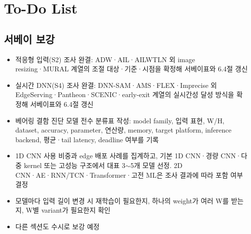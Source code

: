\documentclass[10pt]{article}
\begin{document}
\section{To-Do List}
\subsection{서베이 보강}
\begin{itemize}
\item[$\square$] 적응형 입력(S2) 조사 완결: ADW·AIL·AILWTLN 외 image resizing·MURAL 계열의 조절 대상·기준·시점을 확정해 서베이표와 6.4절 갱신
\item[$\square$] 실시간 DNN(S4) 조사 완결: DNN-SAM·AMS·FLEX·Imprecise 외 EdgeServing·Pantheon·SCENIC·early-exit 계열의 실시간성 달성 방식을 확정해 서베이표와 6.4절 갱신
\item[$\square$] 베어링 결함 진단 모델 전수 분류표 작성: model family, 입력 표현, W/H, dataset, accuracy, parameter, 연산량, memory, target platform, inference backend, 평균·tail latency, deadline 여부를 기록
\item[$\square$] 1D CNN 사용 비중과 edge 배포 사례를 집계하고, 기본 1D CNN·경량 CNN·다중 kernel 또는 고성능 구조에서 대표 3$\sim$5개 모델 선정. 2D CNN·AE·RNN/TCN·Transformer·고전 ML은 조사 결과에 따라 포함 여부 결정
\item[$\square$] 모델마다 입력 길이 변경 시 재학습이 필요한지, 하나의 weight가 여러 W를 받는지, W별 variant가 필요한지 확인
\item[$\square$] 다른 섹션도 수시로 보강 예정
\end{itemize}
\end{document}
